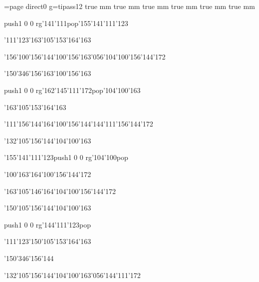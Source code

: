 \chardef\match=\pdfcolorstackinit page direct{0 g}\nopagenumbers\font\ipa=tipass12 true mm true mm true mm true mm true mm true mm
\null\vfill\ipa\centerline{\enskip\pdfcolorstack\match push{1 0 0 rg}\char'141\char'111\pdfcolorstack\match pop{}\enskip\char'155\char'141\char'111\char'123\enskip\enskip\enskip\enskip\enskip\enskip\enskip}\medskip\centerline{\enskip\char'111\char'123\enskip\enskip\enskip\enskip\enskip\enskip\enskip\enskip\char'163\char'105\char'153\char'164\char'163}\medskip\centerline{\enskip\enskip\enskip\enskip\enskip\char'156\char'100\char'156\char'144\enskip\enskip\enskip\enskip\char'100\char'156\char'163\char'056\char'104\char'100\char'156\char'144\char'172}\medskip\centerline{\enskip\char'150\char'346\char'156\char'163\enskip\char'100\char'156\char'163\enskip\enskip\enskip\enskip\enskip\enskip\enskip}\medskip\vfill\footline{\hfil\tt\folio\hfil}\eject
\null\vfill\ipa\centerline{\enskip\enskip\enskip\enskip\pdfcolorstack\match push{1 0 0 rg}\char'162\char'145\char'111\char'172\pdfcolorstack\match pop{}\enskip\enskip\enskip\enskip\char'104\char'100\char'163}\medskip\centerline{\enskip\enskip\enskip\enskip\enskip\enskip\enskip\enskip\enskip\enskip\char'163\char'105\char'153\char'164\char'163}\medskip\centerline{\enskip\char'111\char'156\char'144\enskip\char'164\char'100\char'156\char'144\enskip\enskip\enskip\enskip\enskip\enskip\enskip\char'144\char'111\char'156\char'144\char'172}\medskip\centerline{\enskip\char'132\char'105\char'156\char'144\enskip\enskip\enskip\enskip\enskip\char'104\char'100\char'163\enskip\enskip\enskip\enskip}\medskip\vfill\footline{\hfil\tt\folio\hfil}\eject
\null\vfill\ipa\centerline{\enskip\enskip\enskip\enskip\char'155\char'141\char'111\char'123\enskip\pdfcolorstack\match push{1 0 0 rg}\char'104\char'100\pdfcolorstack\match pop{}\enskip\enskip\enskip\enskip}\medskip\centerline{\enskip\char'100\char'163\enskip\enskip\enskip\enskip\enskip\enskip\enskip\enskip\char'164\char'100\char'156\char'144\char'172}\medskip\centerline{\enskip\enskip\enskip\enskip\enskip\char'163\char'105\char'146\char'164\enskip\enskip\enskip\enskip\enskip\enskip\enskip\char'104\char'100\char'156\char'144\char'172}\medskip\centerline{\enskip\char'150\char'105\char'156\char'144\enskip\enskip\enskip\enskip\enskip\char'104\char'100\char'163\enskip\enskip\enskip\enskip}\medskip\vfill\footline{\hfil\tt\folio\hfil}\eject
\null\vfill\ipa\centerline{\enskip\enskip\enskip\enskip\enskip\enskip\enskip\enskip\enskip\enskip\enskip\enskip\pdfcolorstack\match push{1 0 0 rg}\char'144\char'111\char'123\pdfcolorstack\match pop{}}\medskip\centerline{\enskip\char'111\char'123\enskip\enskip\enskip\enskip\enskip\enskip\enskip\enskip\char'150\char'105\char'153\char'164\char'163}\medskip\centerline{\enskip\enskip\enskip\enskip\enskip\char'150\char'346\char'156\char'144\enskip\enskip\enskip\enskip\enskip\enskip\enskip\enskip\enskip\enskip\enskip\enskip}\medskip\centerline{\enskip\char'132\char'105\char'156\char'144\enskip\enskip\enskip\enskip\enskip\char'104\char'100\char'163\char'056\char'144\char'111\char'172}\medskip\vfill\footline{\hfil\tt\folio\hfil}\eject
